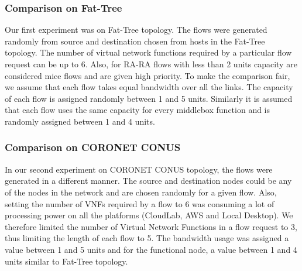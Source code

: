 \subsubsection{Comparison on Fat-Tree}
Our first experiment was on Fat-Tree topology. The flows were generated randomly from source and destination chosen from hosts in the Fat-Tree topology. The number of virtual network functions required by a particular flow request can be up to 6. Also, for RA-RA flows with less than 2 units capacity are considered mice flows and are given high priority.  To make the comparison fair, we assume that each flow takes equal bandwidth over all the links. The capacity of each flow is assigned randomly  between 1 and 5 units. Similarly it is assumed that each flow uses the same capacity for every middlebox function and is randomly assigned between 1 and 4 units. 

\subsubsection{Comparison on CORONET CONUS}
In our second experiment on CORONET CONUS topology, the flows were generated in a different manner. The source and destination nodes could be any of the nodes in the network and are chosen randomly for a given flow. Also, setting the number of VNFs required by a flow to 6 was consuming a lot of processing power on all the platforms (CloudLab, AWS and Local Desktop). We therefore limited the number of Virtual Network Functions in a flow request to 3, thus limiting the length of each flow to 5. The bandwidth usage was assigned a value between 1 and 5 units and for the functional node, a value between 1 and 4 units similar to Fat-Tree topology.
